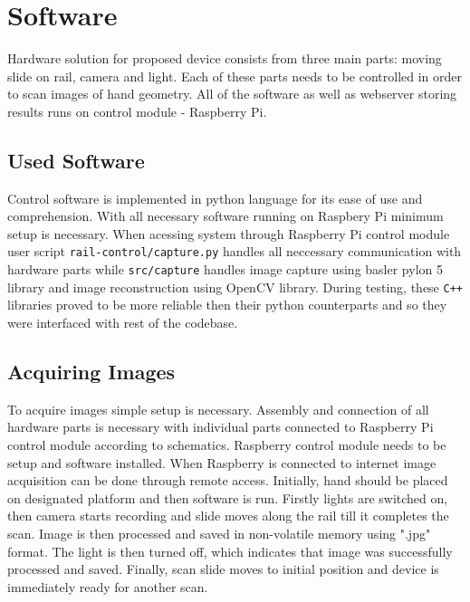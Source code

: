 \section{Software}
Hardware solution for proposed device consists from three main parts: moving slide on rail, camera and light.
Each of these parts needs to be controlled in order to scan images of hand geometry.
All of the software as well as webserver storing results runs on control module - Raspberry Pi.

\label{sec:sw}
\subsection{Used Software}
Control software is implemented in python language for its ease of use and comprehension. With all necessary software running
on Raspbery Pi minimum setup is necessary.
When acessing system through Raspberry Pi control module user script \texttt{rail-control/capture.py} handles all
neccessary communication with hardware parts while \texttt{src/capture} handles image capture using
basler pylon 5 library and image reconstruction using OpenCV library. During testing, these \texttt{C++} libraries proved to be more
reliable then their python counterparts and so they were interfaced with rest of the codebase.

\subsection{Acquiring Images}
To acquire images simple setup is necessary. Assembly and connection of all hardware parts is necessary with individual
parts connected to Raspberry Pi control module according to schematics. Raspberry control module needs to be setup and
software installed.
When Raspberry is connected to internet image acquisition can be done through remote access. Initially, hand should be placed on
designated platform and then software is run. Firstly lights are switched on, then camera starts
recording and slide moves along the rail till it completes the scan. Image is then processed and saved in non-volatile memory using ".jpg" format.
The light is then turned off, which indicates that image was successfully processed and saved. Finally, scan slide moves to initial position and
device is immediately ready for another scan.

